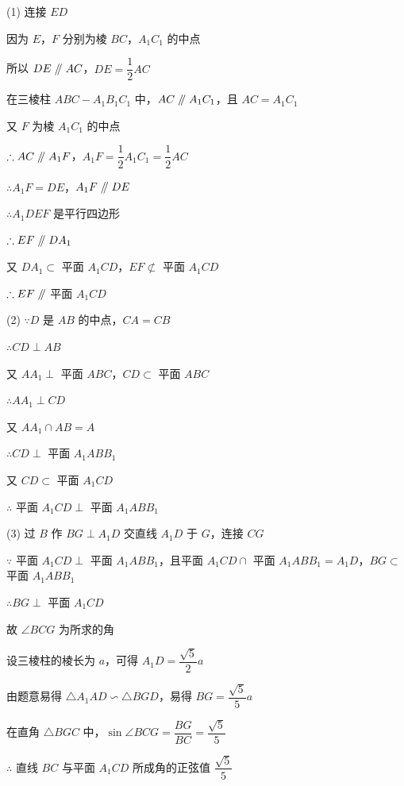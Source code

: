 \begin{solution}
(1) 连接 $ED$

因为 $E$，$F$ 分别为棱 $BC$，$A_1C_1$ 的中点

所以 $DE\mathrel{/\mkern-5mu/} AC$，$DE=\dfrac{1}{2}AC$

在三棱柱 $ABC-A_1B_1C_1$ 中，$AC\mathrel{/\mkern-5mu/} A_1C_1$，且 $AC=A_1C_1$

又 $F$ 为棱 $A_1C_1$ 的中点

$\therefore AC\mathrel{/\mkern-5mu/} A_1F$，$A_1F=\dfrac{1}{2}A_1C_1=\dfrac{1}{2}AC$

$\therefore A_1F=DE$，$A_1F\mathrel{/\mkern-5mu/} DE$

$\therefore A_1DEF$ 是平行四边形

$\therefore EF\mathrel{/\mkern-5mu/} DA_1$

又 $DA_1\subset$ 平面 $A_1CD$，$EF\not\subset$ 平面 $A_1CD$

$\therefore EF\mathrel{/\mkern-5mu/}$ 平面 $A_1CD$

(2) $\because D$ 是 $AB$ 的中点，$CA=CB$

$\therefore CD\perp AB$

又 $AA_1\perp$ 平面 $ABC$，$CD\subset$ 平面 $ABC$

$\therefore AA_1\perp CD$

又 $AA_1\cap AB=A$

$\therefore CD\perp$ 平面 $A_1ABB_1$

又 $CD\subset$ 平面 $A_1CD$

$\therefore$ 平面 $A_1CD\perp$ 平面 $A_1ABB_1$

(3) 过 $B$ 作 $BG\perp A_1D$ 交直线 $A_1D$ 于 $G$，连接 $CG$

$\because$ 平面 $A_1CD\perp$ 平面 $A_1ABB_1$，且平面 $A_1CD\cap$ 平面 $A_1ABB_1=A_1D$，$BG\subset$ 平面 $A_1ABB_1$

$\therefore BG\perp$ 平面 $A_1CD$

故 $\angle BCG$ 为所求的角

设三棱柱的棱长为 $a$，可得 $A_1D=\dfrac{\sqrt{5}}{2}a$

由题意易得 $\triangle A_1AD\backsim\triangle BGD$，易得 $BG=\dfrac{\sqrt{5}}{5}a$

在直角 $\triangle BGC$ 中，$\sin\angle BCG=\dfrac{BG}{BC}=\dfrac{\sqrt{5}}{5}$

$\therefore$ 直线 $BC$ 与平面 $A_1CD$ 所成角的正弦值 $\dfrac{\sqrt{5}}{5}$
\end{solution}

\vspace{2em}
